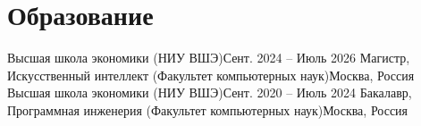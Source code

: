 \section{Образование}
  \resumeSubHeadingListStart
    \resumeSubheading
      {Высшая школа экономики (НИУ ВШЭ)}{Сент. 2024 -- Июль 2026}
      {Магистр, Искусственный интеллект (Факультет компьютерных наук)}{Москва, Россия}
    \resumeSubheading
      {Высшая школа экономики (НИУ ВШЭ)}{Сент. 2020 -- Июль 2024}
      {Бакалавр, Программная инженерия (Факультет компьютерных наук)}{Москва, Россия}
      \resumeItemListStart
      \resumeItemListEnd
  \resumeSubHeadingListEnd